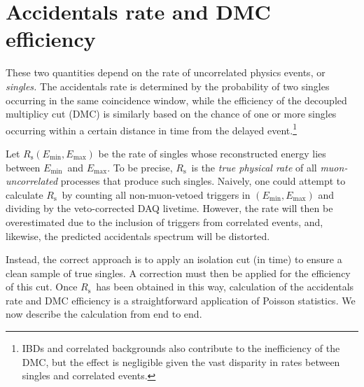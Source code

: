 \documentclass[../thesis.tex]{subfiles}
\begin{document}
\chapter{Accidentals rate and DMC efficiency}
\label{chap:accDMC}

\def\Emin{\ensuremath{E_\mathrm{min}}} \def\Emax{\ensuremath{E_\mathrm{max}}}
\def\Rs{\ensuremath{R_\mathrm{s}}} \def\Rplu{\ensuremath{R_\mathrm{+}}}
\def\Rpro{\ensuremath{R_\mathrm{p}}} \def\Rdel{\ensuremath{R_\mathrm{d}}}
\def\Rsub{\ensuremath{R_\mathrm{\lambda}}} \def\Nplu{\ensuremath{N_\mathrm{+}}}
\def\Npro{\ensuremath{N_\mathrm{p}}} \def\Ndel{\ensuremath{N_\mathrm{d}}}
\def\eisol{\ensuremath{\epsilon_\mathrm{i}}}
\def\emu{\ensuremath{\epsilon_\mathrm{\mu}}}
\def\etot{\ensuremath{\epsilon_\mathrm{tot}}}
\def\Racc{\ensuremath{R_\mathrm{acc}}}

These two quantities depend on the rate of uncorrelated physics events, or
\emph{singles.} The accidentals rate is determined by the probability of two
singles occurring in the same coincidence window, while the efficiency of the
decoupled multiplicy cut (DMC) is similarly based on the chance of one or more
singles occurring within a certain distance in time from the delayed
event.\footnote{IBDs and correlated backgrounds also contribute to the
  inefficiency of the DMC, but the effect is negligible given the vast disparity
  in rates between singles and correlated events.}

Let $\Rs(\Emin, \Emax)$ be the rate of singles whose reconstructed energy lies
between \Emin\ and \Emax. To be precise, \Rs\ is the \emph{true physical rate}
of all \emph{muon-uncorrelated} processes that produce such singles. Naively,
one could attempt to calculate \Rs\ by counting all non-muon-vetoed triggers in
$(\Emin, \Emax)$ and dividing by the veto-corrected DAQ livetime. However, the
rate will then be overestimated due to the inclusion of triggers from correlated
events, and, likewise, the predicted accidentals spectrum will be distorted.

Instead, the correct approach is to apply an isolation cut (in time) to ensure a
clean sample of true singles. A correction must then be applied for the
efficiency of this cut. Once \Rs\ has been obtained in this way, calculation of
the accidentals rate and DMC efficiency is a straightforward application of
Poisson statistics. We now describe the calculation from end to end.
\end{document}
